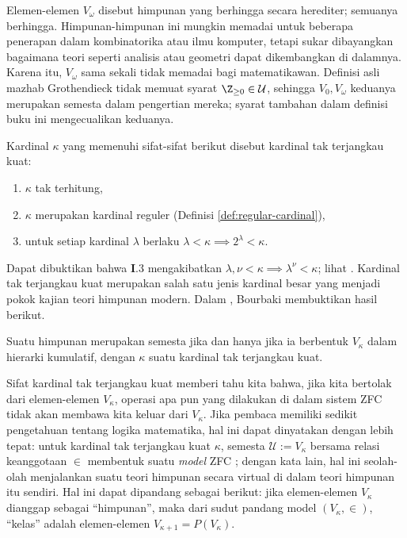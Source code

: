 Elemen-elemen $V_\omega$ disebut himpunan yang berhingga secara herediter; semuanya berhingga. Himpunan-himpunan ini mungkin memadai untuk beberapa penerapan dalam kombinatorika atau ilmu komputer, tetapi sukar dibayangkan bagaimana teori seperti analisis atau geometri dapat dikembangkan di dalamnya. Karena itu, $V_\omega$ sama sekali tidak memadai bagi matematikawan. Definisi asli mazhab Grothendieck tidak memuat syarat $\Z_{\geq 0} \in \mathcal{U}$, sehingga $V_0, V_\omega$ keduanya merupakan semesta dalam pengertian mereka; syarat tambahan dalam definisi buku ini mengecualikan keduanya.

\begin{definition}
	Kardinal $\kappa$ yang memenuhi sifat-sifat berikut disebut kardinal tak terjangkau kuat:
	\begin{enumerate}[\bfseries {I}.1]
		\item $\kappa$ tak terhitung,
		\item $\kappa$ merupakan kardinal reguler (Definisi \ref{def:regular-cardinal}),
		\item untuk setiap kardinal $\lambda$ berlaku $\lambda < \kappa \implies 2^\lambda < \kappa$.
	\end{enumerate}
\end{definition}
Dapat dibuktikan bahwa \textbf{I}.3 mengakibatkan $\lambda, \nu < \kappa \implies \lambda^\nu < \kappa$; lihat \cite[p.58]{Je03}. Kardinal tak terjangkau kuat merupakan salah satu jenis kardinal besar yang menjadi pokok kajian teori himpunan modern. Dalam \cite[Exp. I, Appendice]{SGA4-1}, Bourbaki membuktikan hasil berikut.
\begin{theorem}
	Suatu himpunan merupakan semesta jika dan hanya jika ia berbentuk $V_\kappa$ dalam hierarki kumulatif, dengan $\kappa$ suatu kardinal tak terjangkau kuat.
\end{theorem}

Sifat kardinal tak terjangkau kuat memberi tahu kita bahwa, jika kita bertolak dari elemen-elemen $V_\kappa$, operasi apa pun yang dilakukan di dalam sistem ZFC tidak akan membawa kita keluar dari $V_\kappa$. Jika pembaca memiliki sedikit pengetahuan tentang logika matematika, hal ini dapat dinyatakan dengan lebih tepat: untuk kardinal tak terjangkau kuat $\kappa$, semesta $\mathcal{U} := V_\kappa$ bersama relasi keanggotaan $\in$ membentuk suatu \emph{model} ZFC \cite[Lemma 12.13]{Je03}; dengan kata lain, hal ini seolah-olah menjalankan suatu teori himpunan secara virtual di dalam teori himpunan itu sendiri. Hal ini dapat dipandang sebagai berikut: jika elemen-elemen $V_\kappa$ dianggap sebagai ``himpunan'', maka dari sudut pandang model $(V_\kappa, \in)$, ``kelas'' adalah elemen-elemen $V_{\kappa+1} = P(V_\kappa)$.

